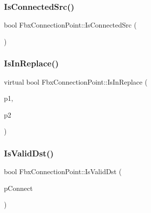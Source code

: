 \mbox{\label{class_fbx_connection_point_accccefb83ec8fa6eda6bdab0d1b927f9}} 
\subsubsection{\texorpdfstring{Is\+Connected\+Src()}{IsConnectedSrc()}}
{\footnotesize\ttfamily bool Fbx\+Connection\+Point\+::\+Is\+Connected\+Src (\begin{DoxyParamCaption}\item[{\hyperlink{class_fbx_connection_point}{Fbx\+Connection\+Point} $\ast$}]{ }\end{DoxyParamCaption})}

\mbox{\label{class_fbx_connection_point_a7be04c356de5cd97c7c3f1c63b2830f1}} 
\subsubsection{\texorpdfstring{Is\+In\+Replace()}{IsInReplace()}}
{\footnotesize\ttfamily virtual bool Fbx\+Connection\+Point\+::\+Is\+In\+Replace (\begin{DoxyParamCaption}\item[{\hyperlink{class_fbx_connection_point}{Fbx\+Connection\+Point} $\ast$}]{p1,  }\item[{\hyperlink{class_fbx_connection_point}{Fbx\+Connection\+Point} $\ast$}]{p2 }\end{DoxyParamCaption})\hspace{0.3cm}{\ttfamily [virtual]}}

\mbox{\label{class_fbx_connection_point_af2fc3a91ca6a8afd4c51ff40bf505ba6}} 
\subsubsection{\texorpdfstring{Is\+Valid\+Dst()}{IsValidDst()}}
{\footnotesize\ttfamily bool Fbx\+Connection\+Point\+::\+Is\+Valid\+Dst (\begin{DoxyParamCaption}\item[{\hyperlink{class_fbx_connection_point}{Fbx\+Connection\+Point} $\ast$}]{p\+Connect }\end{DoxyParamCaption})}

